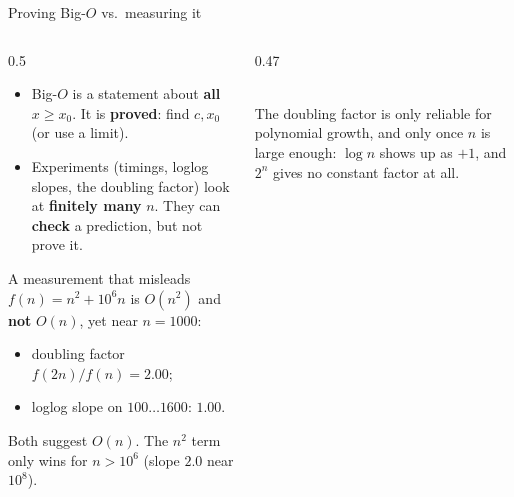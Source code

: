 \documentclass[aspectratio=169]{beamer}
\begin{document}
\begin{frame}{Proving Big-$O$ vs.\ measuring it}
\begin{columns}[T]
\begin{column}{0.5\textwidth}
\small
\begin{itemize}
  \item Big-$O$ is a statement about \textbf{all} $x \ge x_0$. It is \textbf{proved}: find $c, x_0$ (or use a limit).
  \item Experiments (timings, loglog slopes, the doubling factor) look at \textbf{finitely many} $n$. They can \textbf{check} a prediction, but not prove it.
\end{itemize}
\begin{alertblock}{A measurement that misleads}
\footnotesize
$f(n) = n^2 + 10^6 n$ is $O(n^2)$ and \textbf{not} $O(n)$, yet near $n = 1000$:
\begin{itemize}\footnotesize
  \item doubling factor $f(2n)/f(n) = 2.00$;
  \item loglog slope on $100 \ldots 1600$: $1.00$.
\end{itemize}
Both suggest $O(n)$. The $n^2$ term only wins for $n > 10^6$ (slope $2.0$ near $10^8$).
\end{alertblock}
\end{column}
\begin{column}{0.47\textwidth}
\centering
{}\\[2pt]
\scriptsize The doubling factor is only reliable for polynomial growth, and only once $n$ is large enough: $\log n$ shows up as $+1$, and $2^n$ gives no constant factor at all.
\end{column}
\end{columns}
\end{frame}
\end{document}
